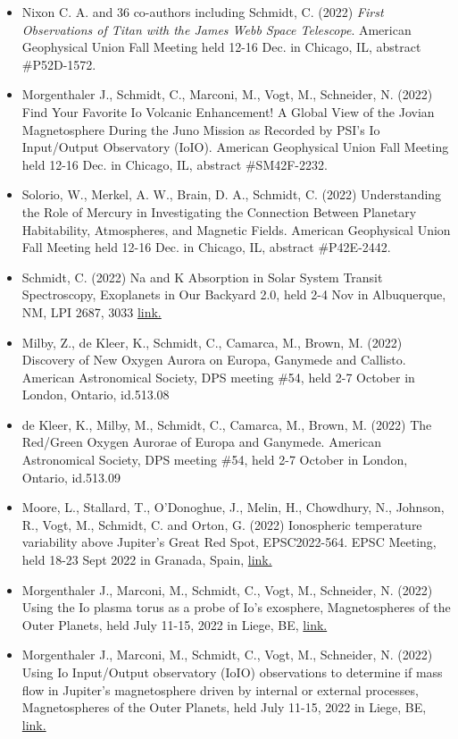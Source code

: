 \documentclass[12pt]{report}
\begin{document}
\begin{itemize}
   \item Nixon C. A. and 36 co-authors including Schmidt, C. (2022) \textit{First Observations of Titan with the James Webb Space Telescope}.  American Geophysical Union Fall Meeting held 12-16 Dec. in Chicago, IL, abstract \#P52D-1572.
   \item Morgenthaler J., Schmidt, C., Marconi, M., Vogt, M., Schneider, N. (2022) Find Your Favorite Io Volcanic Enhancement! A Global View of the Jovian Magnetosphere During the Juno Mission as Recorded by PSI's Io Input/Output Observatory (IoIO). American Geophysical Union Fall Meeting held 12-16 Dec. in Chicago, IL, abstract \#SM42F-2232.
   \item Solorio, W., Merkel, A. W., Brain, D. A., Schmidt, C. (2022) Understanding the Role of Mercury in Investigating the Connection Between Planetary Habitability, Atmospheres, and Magnetic Fields. American Geophysical Union Fall Meeting held 12-16 Dec. in Chicago, IL, abstract \#P42E-2442.
   \item Schmidt, C. (2022) Na and K Absorption in Solar System Transit Spectroscopy, Exoplanets in Our Backyard 2.0, held 2-4 Nov in Albuquerque, NM, LPI 2687, 3033 \href{https://www.hou.usra.edu/meetings/exoplanets2022/pdf/3033.pdf}{link.} 
   \item Milby, Z., de Kleer, K., Schmidt, C., Camarca, M., Brown, M. (2022) Discovery of New Oxygen Aurora on Europa, Ganymede and Callisto. American Astronomical Society, DPS meeting \#54, held 2-7 October in London, Ontario, id.513.08
   \item de Kleer, K., Milby, M., Schmidt, C., Camarca, M., Brown, M. (2022) The Red/Green Oxygen Aurorae of Europa and Ganymede. American Astronomical Society, DPS meeting \#54, held 2-7 October in London, Ontario, id.513.09
   \item Moore, L., Stallard, T., O'Donoghue, J., Melin, H., Chowdhury, N., Johnson, R., Vogt, M.,  Schmidt, C. and Orton, G. (2022) Ionospheric temperature variability above Jupiter's Great Red Spot, EPSC2022-564. EPSC Meeting, held 18-23 Sept 2022 in Granada, Spain, \href{https://meetingorganizer.copernicus.org/epsc2022/sessionprogramme}{link.}
   \item Morgenthaler J., Marconi, M., Schmidt, C., Vogt, M., Schneider, N. (2022) Using the Io plasma torus as a probe of Io's exosphere,  Magnetospheres of the Outer Planets, held July 11-15, 2022 in Liege, BE, \href{ https://www.mop.uliege.be/}{link.}
   \item Morgenthaler J., Marconi, M., Schmidt, C., Vogt, M., Schneider, N. (2022)  Using Io Input/Output observatory (IoIO) observations to determine if mass flow in Jupiter's magnetosphere driven by internal or external processes,  Magnetospheres of the Outer Planets, held July 11-15, 2022 in Liege, BE, \href{ https://www.mop.uliege.be/}{link.}

\end{itemize}
\end{document}
